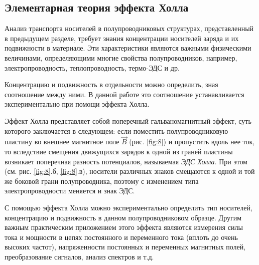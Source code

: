 \subsection{Элементарная теория эффекта Холла}
Анализ транспорта носителей в полупроводниковых структурах, представленный в предыдущем разделе, требует знания концентрации носителей заряда и их подвижности в материале. Эти характеристики являются важными физическими величинами, определяющими многие свойства полупроводников, например, электропроводность, теплопроводность, термо-ЭДС и др.

Концентрацию и подвижность в отдельности можно определить, зная соотношение между ними. В данной работе это соотношение устанавливается экспериментально при помощи эффекта Холла.

Эффект Холла представляет собой поперечный гальваномагнитный эффект, суть которого заключается в следующем: если поместить полупроводниковую пластину во внешнее магнитное поле $\vec B$ (рис. \ref{fig:8}) и пропустить вдоль нее ток, то вследствие смещения движущихся зарядов к одной из граней пластины возникает поперечная разность потенциалов, называемая \textit{ЭДС Холла}. При этом (см. рис. \ref{fig:8}.б, \ref{fig:8}.в), носители различных знаков смещаются к одной и той же боковой грани полупроводника, поэтому с изменением типа электропроводности меняется и знак ЭДС.

С помощью эффекта Холла можно экспериментально определить тип носителей, концентрацию и подвижность в данном полупроводниковом образце. Другим важным практическим приложением этого эффекта являются измерения силы тока и мощности в цепях постоянного и переменного тока  (вплоть до очень высоких частот), напряженности постоянных и переменных магнитных полей, преобразование сигналов, анализ спектров и т.д.

